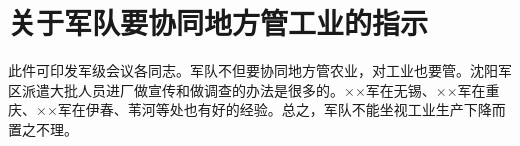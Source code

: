 \section[关于军队要协同地方管工业的指示（一九六七年三月三日）]{关于军队要协同地方管工业的指示}


此件可印发军级会议各同志。军队不但要协同地方管农业，对工业也要管。沈阳军区派遣大批人员进厂做宣传和做调查的办法是很多的。××军在无锡、××军在重庆、××军在伊春、苇河等处也有好的经验。总之，军队不能坐视工业生产下降而置之不理。


